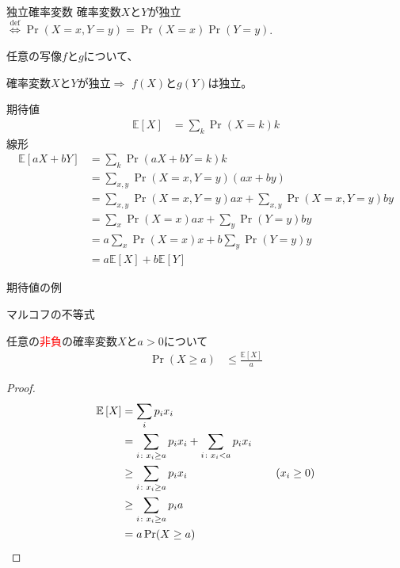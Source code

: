 \documentclass[lualatex,handout]{beamer}
\newcommand{\emm}[1]{\textcolor{red}{#1}}
\newcommand{\expt}[1]{\mathbb{E}\left[#1\right]}
\theoremstyle{definition}
\begin{document}
\begin{frame}{独立確率変数}
確率変数$X$と$Y$が独立$\stackrel{\mathrm{def}}{\iff}\Pr(X=x,Y=y)=\Pr(X=x)\Pr(Y=y)$.

\vspace{2em}
任意の写像$f$と$g$について、

確率変数$X$と$Y$が独立$\Longrightarrow$ $f(X)$と$g(Y)$は独立。
\end{frame}

\begin{frame}{期待値}
\begin{align*}
\expt{X} &= \sum_k \Pr(X=k) k
\end{align*}
線形
\begin{align*}
\expt{aX + bY} &= \sum_k \Pr(aX+bY=k) k\\
&= \sum_{x, y} \Pr(X=x, Y=y) (ax+by)\\
&= \sum_{x, y} \Pr(X=x, Y=y) ax + \sum_{x, y} \Pr(X=x, Y=y) by\\
&= \sum_{x} \Pr(X=x) ax + \sum_{y} \Pr(Y=y) by\\
&= a\sum_{x} \Pr(X=x) x + b\sum_{y} \Pr(Y=y) y\\
&=a\expt{X} + b\expt{Y} 
\end{align*}
\end{frame}

\begin{frame}{期待値の例}

\end{frame}


\begin{frame}{マルコフの不等式}
\begin{theorem}[マルコフの不等式]
任意の\emm{非負}の確率変数$X$と$a>0$について
\begin{align*}
\Pr(X\ge a) &\le \frac{\expt{X}}{a}
\end{align*}
\end{theorem}
\begin{proof}
\vspace{-2em}
\begin{align*}
\expt{X} &= \sum_i p_i x_i\\
&= \sum_{i\colon x_i \ge a} p_i x_i
+ \sum_{i\colon x_i < a} p_i x_i\\
&\ge \sum_{i\colon x_i \ge a} p_i x_i\hspace{8em}(x_i\ge 0)\\
&\ge \sum_{i\colon x_i \ge a} p_i a\\
&= a\Pr(X\ge a) \qedhere
\end{align*}
\end{proof}
\end{frame}
\end{document}
